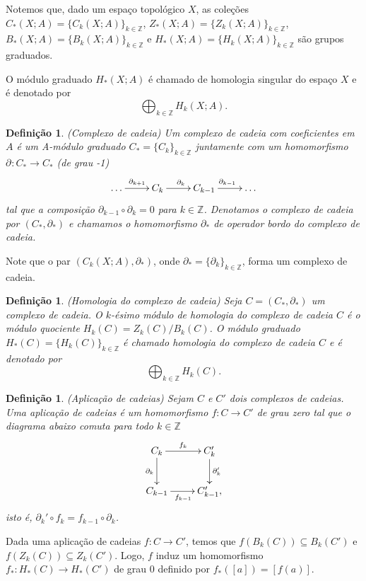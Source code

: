 \documentclass[12pt]{book}
\newtheorem{definicao}[teorema]{Definição}
\newcommand{\bordo}[1]{\partial_{#1}}
\newcommand{\cadeia}[2]{C_{#1}(#2; A)}
\newcommand{\classe}[1]{[#1]}
\newcommand{\colecao}[1]{\{#1_{k} \}_{k\in \inteiros}}
\newcommand{\colecaoabrev}[1]{\{#1 \}_{k\in \inteiros}}
\newcommand{\homologia}[2]{H_{#1}(#2;A)}
\newcommand{\homologiaabrev}[2]{H_{#1}(#2)}
\newcommand{\imagembordo}[2]{B_{#1}(#2;A)}
\newcommand{\imagembordoabrev}[2]{B_{#1}(#2)}
\newcommand{\inteiros}{\mathbb{Z}}
\newcommand{\kernelbordo}[2]{Z_{#1}(#2;A)}
\newcommand{\kernelbordoabrev}[2]{Z_{#1}(#2)}
\begin{document}
	Notemos que, dado um espaço topológico $X$, as coleções $\cadeia{*}{X} = \colecaoabrev{\cadeia{k}{X}}$, $\kernelbordo{*}{X}=\colecaoabrev{\kernelbordo{k}{X}}$, $\imagembordo{*}{X}=\colecaoabrev{\imagembordo{k}{X}}$ e $\homologia{*}{X}=\colecaoabrev{\homologia{k}{X}}$ são grupos graduados.
	
	O módulo graduado $\homologia{*}{X}$ é chamado de homologia singular do espaço $X$ e é denotado por
	$$
	\bigoplus_{k\in \inteiros}\homologia{k}{X}.
	$$
	
	\begin{definicao}
		(Complexo de cadeia) Um complexo de cadeia com coeficientes em $A$ é um A-módulo graduado $C_{*} = \colecao{C}$ juntamente com um homomorfismo $\bordo{}:C_{*} \to C_{*}$ (de grau -1)
		$$
		\xymatrix{
			\dots \ar[r]^{\bordo{k+1}}  & C_{k} \ar[r]^{\bordo{k}} & C_{k-1}\ar[r]^{\bordo{k-1}} &\dots
		}
		$$
		tal que a composição $\bordo{k-1}\circ\bordo{k} = 0$ para $k \in \inteiros$. Denotamos o complexo de cadeia por $(C_{*}, \bordo{*})$ e chamamos o homomorfismo $\bordo{*}$ de operador bordo do complexo de cadeia.
	\end{definicao}
	
	Note que o par $(\cadeia{k}{X}, \bordo{*})$, onde $\bordo{*}=\colecaoabrev{\bordo{k}}$, forma um complexo de cadeia.
	
	\begin{definicao}
		(Homologia do complexo de cadeia) Seja $C=(C_{*}, \bordo{*})$ um complexo de cadeia. O $k$-ésimo módulo de homologia do complexo de cadeia $C$ é o módulo quociente
		$\homologiaabrev{k}{C} = \kernelbordoabrev{k}{C}/\imagembordoabrev{k}{C}$. O módulo graduado $\homologiaabrev{*}{C} = \colecaoabrev{\homologiaabrev{k}{C}}$ é chamado homologia do complexo de cadeia $C$ e é denotado por
		$$
		\bigoplus_{k\in \inteiros}\homologiaabrev{k}{C}.
		$$				
	\end{definicao}

	\begin{definicao}
		(Aplicação de cadeias) Sejam $C$ e $C'$ dois complexos de cadeias. Uma aplicação de cadeias é um homomorfismo $f:C\to C'$ de grau zero tal que o diagrama abaixo comuta para todo $k \in \inteiros$
		$$
		\xymatrix{
			C_{k}\ar[d]_{\bordo{k}}\ar[r]^{f_{k}}  & C'_{k}\ar[d]^{\bordo{k}'} 
			\\
			C_{k-1}\ar[r]_{f_{k-1}} & C'_{k-1},
		}
		$$
		isto é, $\bordo{k}'\circ f_{k} = f_{k-1}\circ \bordo{k}$.
	\end{definicao}
	
	Dada uma aplicação de cadeias $f:C\to C'$, temos que $f(\imagembordoabrev{k}{C})\subseteq \imagembordoabrev{k}{C'}$ e $f(\kernelbordoabrev{k}{C})\subseteq \kernelbordoabrev{k}{C'}$. Logo, $f$ induz um homomorfismo $f_{*}:\homologiaabrev{*}{C}  \to \homologiaabrev{*}{C'}$ de grau 0 definido por $f_{*}(\classe{a}) = \classe{f(a)}$.
	
\end{document}
